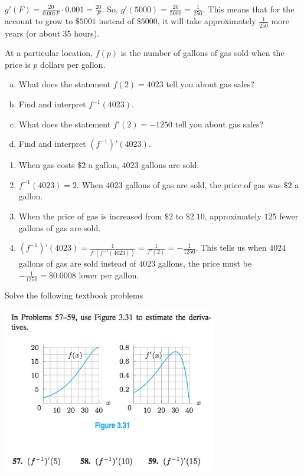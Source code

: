 \documentclass[11pt]{exam}
\begin{document}
\begin{questions}
\begin{solution}
    \(g'(F) =
    \frac{20}{0.001 F} \cdot 0.001 = \frac{20}{F}\). So, \(g'(5000) =
    \frac{20}{5000} = \frac{1}{250}\). This means that for the account
    to grow to \(\$5001\) instead of \(\$5000\), it will take
    approximately \(\frac{1}{250}\) more years (or about \(35\) hours).
  \end{solution}
\question At a particular location, \(f(p)\) is the number of gallons
  of gas sold when the price is \(p\) dollars per gallon.
  \begin{enumerate}[(a)]
  \item What does the statement \(f(2) = 4023\) tell you about gas sales?
  \item Find and interpret \(f^{-1}(4023)\).
  \item What does the statement \(f'(2) = -1250\) tell you about gas sales?
  \item Find and interpret \((f^{-1})'(4023)\).
  \end{enumerate}
  \begin{solution}
    \begin{enumerate}
    \item When gas costs \(\$2\) a gallon, \(4023\) gallons are sold.
    \item \(f^{-1}(4023) = 2\). When \(4023\) gallons of gas are sold, the
      price of gas was \(\$2\) a gallon.
    \item When the price of gas is increased from \(\$2\) to
      \(\$2.10\), approximately \(125\) fewer gallons of gas are sold.
    \item \((f^{-1})'(4023) = \frac{1}{f'(f^{-1}(4023))} =
      \frac{1}{f'(2)} = -\frac{1}{1250}\). This tells us when \(4024\)
      gallons of gas are sold instead of \(4023\) gallons, the price
      must be \(-\frac{1}{1250} = \$0.0008\) lower per gallon.
    \end{enumerate}
  \end{solution}
  \pagebreak
\question Solve the following textbook problems \\
  \vspace{-0.3in}
  \begin{multicols}{2}
\hspace*{-1cm}\includegraphics[width=3.7in]{no57to59.jpg}



\end{multicols}
\end{questions}
\end{document}
